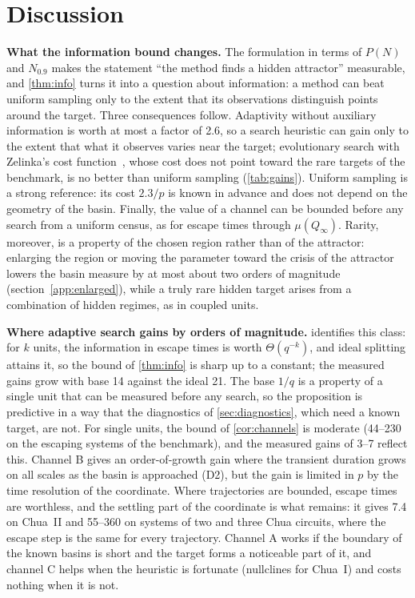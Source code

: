 \section{Discussion}\label{sec:discussion}

\textbf{What the information bound changes.} The formulation in terms of $P(N)$ and $N_{0.9}$ makes the statement ``the method finds a hidden attractor'' measurable, and \cref{thm:info} turns it into a question about information: a method can beat uniform sampling only to the extent that its observations distinguish points around the target. Three consequences follow. Adaptivity without auxiliary information is worth at most a factor of 2.6, so a search heuristic can gain only to the extent that what it observes varies near the target; evolutionary search with Zelinka's cost function~\cite{Zelinka2016}, whose cost does not point toward the rare targets of the benchmark, is no better than uniform sampling (\cref{tab:gains}). Uniform sampling is a strong reference: its cost $2.3/p$ is known in advance and does not depend on the geometry of the basin. Finally, the value of a channel can be bounded before any search from a uniform census, as for escape times through $\mu(Q_\infty)$. Rarity, moreover, is a property of the chosen region rather than of the attractor: enlarging the region or moving the parameter toward the crisis of the attractor lowers the basin measure by at most about two orders of magnitude (section~\ref{app:enlarged}), while a truly rare hidden target arises from a combination of hidden regimes, as in coupled units.

\textbf{Where adaptive search gains by orders of magnitude.}  identifies this class: for $k$ units, the information in escape times is worth $\Theta(q^{-k})$, and ideal splitting attains it, so the bound of \cref{thm:info} is sharp up to a constant; the measured gains grow with base 14 against the ideal 21. The base $1/q$ is a property of a single unit that can be measured before any search, so the proposition is predictive in a way that the diagnostics of \cref{sec:diagnostics}, which need a known target, are not. For single units, the bound of \cref{cor:channels} is moderate (44--230 on the escaping systems of the benchmark), and the measured gains of 3--7 reflect this. Channel B gives an order-of-growth gain where the transient duration grows on all scales as the basin is approached (D2), but the gain is limited in $p$ by the time resolution of the coordinate. Where trajectories are bounded, escape times are worthless, and the settling part of the coordinate is what remains: it gives 7.4 on Chua~II and 55--360 on systems of two and three Chua circuits, where the escape step is the same for every trajectory. Channel A works if the boundary of the known basins is short and the target forms a noticeable part of it, and channel C helps when the heuristic is fortunate (nullclines for Chua~I) and costs nothing when it is not.

